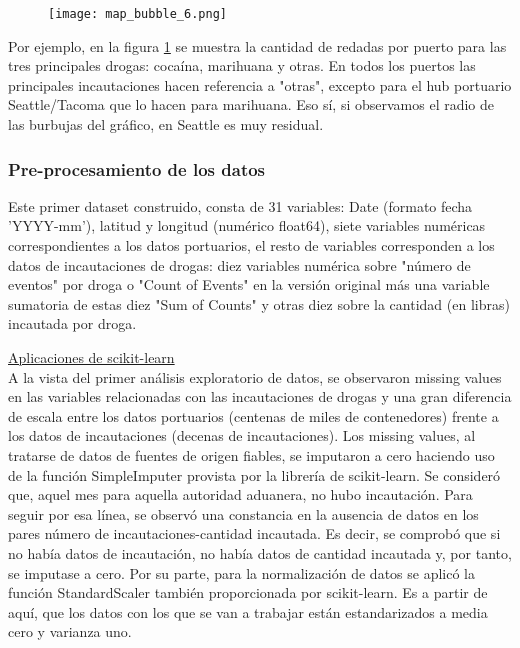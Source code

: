 \documentclass[12pt]{article}
\begin{document}
		\begin{figure}[H]
			\caption{\label{map_bubble_6} }
			\centering
			\hspace*{1cm}
			\texttt{[image: map\_bubble\_6.png]}
		\end{figure}
		
		Por ejemplo, en la figura \ref{map_bubble_6} se muestra la cantidad de redadas por puerto para las tres principales drogas: cocaína, marihuana y otras. En todos los puertos las principales incautaciones hacen referencia a "otras", excepto para el hub portuario Seattle/Tacoma que lo hacen para marihuana. Eso sí, si observamos el radio de las burbujas del gráfico, en Seattle es muy residual.
		
		
		
		\subsubsection{\label{preprocessing}Pre-procesamiento de los datos}
		Este primer dataset construido, consta de 31 variables: Date (formato fecha 'YYYY-mm'), latitud y longitud (numérico float64), siete variables numéricas correspondientes a los datos portuarios, el resto de variables corresponden a los datos de incautaciones de drogas: diez variables numérica sobre "número de eventos" por droga o "Count of Events" en la versión original más una variable sumatoria de estas diez "Sum of Counts" y otras diez sobre la cantidad (en libras) incautada por droga.\
		
		\underline{Aplicaciones de scikit-learn}\\
		A la vista del primer análisis exploratorio de datos, se observaron missing values en las variables relacionadas con las incautaciones de drogas y una gran diferencia de escala entre los datos portuarios (centenas de miles de contenedores) frente a los datos de incautaciones (decenas de incautaciones). Los missing values, al tratarse de datos de fuentes de origen fiables, se imputaron a cero haciendo uso de la función SimpleImputer provista por la librería de scikit-learn. Se consideró que, aquel mes para aquella autoridad aduanera, no hubo incautación. Para seguir por esa línea, se observó una constancia en la ausencia de datos en los pares número de incautaciones-cantidad incautada. Es decir, se comprobó que si no había datos de incautación, no había datos de cantidad incautada y, por tanto, se imputase a cero. Por su parte, para la normalización de datos se aplicó la función StandardScaler también proporcionada por scikit-learn. Es a partir de aquí, que los datos con los que se van a trabajar están estandarizados a media cero y varianza uno.\
		
\end{document}
